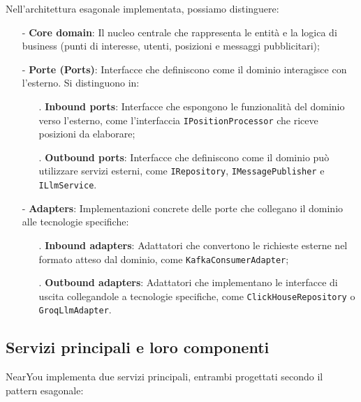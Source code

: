 \documentclass[10pt]{article}
\begin{document}
    Nell'architettura esagonale implementata, possiamo distinguere:
    
    \begin{itemize}
        \item[-] \textbf{Core domain}: Il nucleo centrale che rappresenta le entità e la logica di business (punti di interesse, utenti, posizioni e messaggi pubblicitari);
        \item[-] \textbf{Porte (Ports)}: Interfacce che definiscono come il dominio interagisce con l'esterno. Si distinguono in:
        \begin{itemize}
            \item[.] \textbf{Inbound ports}: Interfacce che espongono le funzionalità del dominio verso l'esterno, come l'interfaccia \texttt{IPositionProcessor} che riceve posizioni da elaborare;
            \item[.] \textbf{Outbound ports}: Interfacce che definiscono come il dominio può utilizzare servizi esterni, come \texttt{IRepository}, \texttt{IMessagePublisher} e \texttt{ILlmService}.
        \end{itemize}
        \item[-] \textbf{Adapters}: Implementazioni concrete delle porte che collegano il dominio alle tecnologie specifiche:
        \begin{itemize}
            \item[.] \textbf{Inbound adapters}: Adattatori che convertono le richieste esterne nel formato atteso dal dominio, come \texttt{KafkaConsumerAdapter};
            \item[.] \textbf{Outbound adapters}: Adattatori che implementano le interfacce di uscita collegandole a tecnologie specifiche, come \texttt{ClickHouseRepository} o \texttt{GroqLlmAdapter}.
        \end{itemize}
    \end{itemize}

    \subsection{Servizi principali e loro componenti}
    
    NearYou implementa due servizi principali, entrambi progettati secondo il pattern esagonale:
\end{document}
